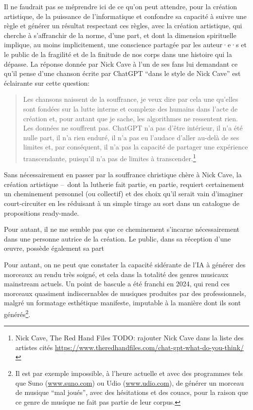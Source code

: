 Il ne faudrait pas se méprendre ici de ce qu'on peut attendre, pour la création artistique, de la puissance de l'informatique et confondre sa capacité à suivre une règle et générer un résultat respectant ces règles, avec la création artistique, qui cherche à s'affranchir de la norme, d'une part, et dont la dimension spirituelle implique, au moins implicitement, une conscience partagée par les auteur·e·s et le public de la fragilité et de la finitude de nos corps dans une histoire qui la dépasse. La réponse donnée par Nick Cave à l'un de ses fans lui demandant ce qu'il pense d'une chanson écrite par ChatGPT ``dans le style de Nick Cave'' est éclairante sur cette question:

\begin{quotation}
Les chansons naissent de la souffrance, je veux dire par cela une qu'elles sont fondées sur la lutte interne et complexe des humains dans l'acte de création et, pour autant que je sache, les algorithmes ne ressentent rien. Les données ne souffrent pas. ChatGPT n'a pas d'être intérieur, il n'a été nulle part, il n'a rien enduré, il n'a pas eu l'audace d'aller au-delà de ses limites et, par conséquent, il n'a pas la capacité de partager une expérience transcendante, puisqu'il n'a pas de limites à transcender.\footnote{Nick Cave, The Red Hand Files TODO: rajouter Nick Cave dans la liste des artistes cités \url{https://www.theredhandfiles.com/chat-gpt-what-do-you-think/}}
\end{quotation}

Sans nécessairement en passer par la souffrance christique chère à Nick Cave, la création artistique --~dont la lutherie fait partie, en partie, requiert certainement un cheminement personnel (ou collectif) et des choix qu'il serait vain d'imaginer court-circuiter en les réduisant à un simple tirage au sort dans un catalogue de propositions ready-made.

Pour autant, il ne me semble pas que ce cheminement s'incarne nécessairement dans une personne autrice de la création. Le public, dans sa réception d'une œuvre, possède également sa part 

Pour autant, on ne peut que constater la capacité sidérante de l'IA à générer des morceaux au rendu très soigné, et cela dans la totalité des genres musicaux mainstream actuels. Un point de bascule a été franchi en 2024, qui rend ces morceaux quasiment indiscernables de musiques produites par des professionnels, malgré un formatage esthétique manifeste, imputable à la manière dont ils sont générés\footnote{Il est par exemple impossible, à l'heure actuelle et avec des programmes tels que Suno (\url{www.suno.com}) ou Udio (\url{www.udio.com}), de générer un morceau de musique ``mal joués'', avec des hésitations et des couacs, pour la raison que ce genre de musique ne fait pas partie de leur corpus.}.


